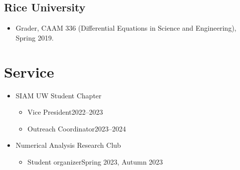 \documentclass{cv_style}
\begin{document}
		\subsection{Rice University}
		\begin{itemize}
			\item Grader, CAAM 336 (Differential Equations in Science and Engineering), Spring 2019.
		\end{itemize}
		
	\section{Service}
	
	
	\begin{itemize}
		\item SIAM UW Student Chapter
		\begin{itemize}
			\item Vice President\hfill 2022--2023
			\item Outreach Coordinator\hfill 2023--2024
		\end{itemize}
		\item Numerical Analysis Research Club
		\begin{itemize}
			\item Student organizer\hfill Spring 2023, Autumn 2023
		\end{itemize}
	\end{itemize}
		
		
\end{document}
